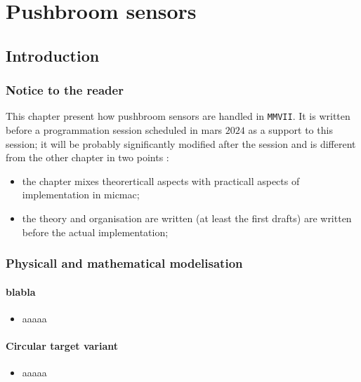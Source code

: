 \chapter{Pushbroom sensors}
\label{Chap:PushBroom}




\section{Introduction }

\subsection{Notice to the reader}

This chapter present how pushbroom sensors are handled in {\tt MMVII}.
It is written before a programmation session scheduled in mars $2024$
as a support to this session;
it will be probably significantly modified after the session and is different
from the other chapter in two points :

\begin{itemize}
	\item  the  chapter mixes theorerticall aspects with practicall aspects
		of implementation in micmac;
	\item  the theory and organisation are written (at least the first drafts)
		are written before the actual implementation;
\end{itemize}


\subsection{Physicall and mathematical modelisation}

\subsubsection{blabla}

\begin{itemize}
    \item aaaaa
\end{itemize}





\subsubsection{Circular target variant}

\begin{itemize}
    \item aaaaa
\end{itemize}


